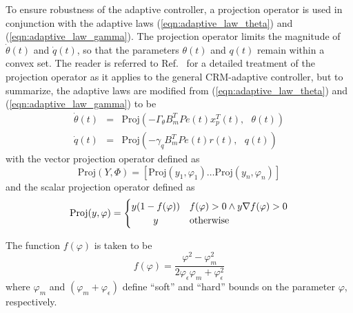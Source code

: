 To ensure robustness of the adaptive controller, a projection operator\cite{pomet1992adaptive, lavretsky2011projection} is used in conjunction with the adaptive laws (\ref{eqn:adaptive_law_theta}) and (\ref{eqn:adaptive_law_gamma}). The projection operator limits the magnitude of $\dot{\theta}(t)$ and $\dot{q}(t)$, so that the parameters $\theta(t)$ and $q(t)$ remain within a convex set. The reader is referred to Ref.~\cite{gibson2013adaptive} for a detailed treatment of the projection operator as it applies to the general CRM-adaptive controller, but to summarize, the adaptive laws are modified from (\ref{eqn:adaptive_law_theta}) and (\ref{eqn:adaptive_law_gamma}) to be
\begin{eqnarray}
	\dot{\theta}(t) &=& \text{Proj}(- \Gamma_\theta B_m^T P e(t) x_p^T(t),\text{ } \theta(t)) \label{eqn:thetadot_projection} \\
	\dot{q}(t) &=& \text{Proj}(- \gamma_q B_m^T P e(t) r(t),\text{ } q(t)) \label{eqn:qdot_projection}
\end{eqnarray}
\noindent with the vector projection operator defined as
\begin{equation}
	\text{Proj}(Y, \Phi) = \left[ \text{Proj}(y_1, \varphi_1) \ldots \text{Proj}(y_n, \varphi_n) \right]
\end{equation}
\noindent and the scalar projection operator defined as
\begin{equation} %
	\text{Proj}(y, \varphi) = \begin{cases}
		y(1 - f(\varphi)) & f(\varphi) > 0 \land y \nabla f(\varphi) > 0\\
		\hfil y & \text{otherwise}
	\end{cases}
\end{equation}

\noindent The function $f(\varphi)$ is taken to be
\begin{equation}
	f(\varphi) = \frac{\varphi^2 - \varphi_{m}^2}{2 \varphi_{\epsilon} \varphi_{m} + \varphi_{\epsilon}^2}
	\label{eqn:proj_function}
\end{equation}
\noindent where $\varphi_{m}$ and $(\varphi_{m} + \varphi_{\epsilon})$ define ``soft'' and ``hard'' bounds on the parameter $\varphi$, respectively.

